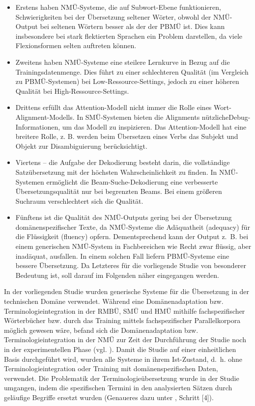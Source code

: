 \sloppy
\begin{itemize}
\item
Erstens haben NMÜ-Systeme, die auf Subwort{}-Ebene funktionieren, Schwierigkeiten bei der Übersetzung seltener Wörter, obwohl der NMÜ-Output bei seltenen Wörtern besser als der der PBMÜ ist. Dies kann insbesondere bei stark flektierten Sprachen ein Problem darstellen, da viele Flexionsformen selten auftreten können.
\item
Zweitens haben NMÜ-Systeme eine steilere Lernkurve in Bezug auf die Trainingsdatenmenge. Dies führt zu einer schlechteren Qualität (im Vergleich zu PBMÜ-Systemen) bei Low-Ressource-Settings, jedoch zu einer höheren Qualität bei High-Ressource-Settings.
\item
Drittens erfüllt das Attention-Modell nicht immer die Rolle eines Wort-Align\-ment-Modells. In SMÜ-Systemen bieten die Alignments nützliche\linebreak De\-bug-Informationen, um das Modell zu inspizieren. Das Attention-Modell hat eine breitere Rolle, z. B. werden beim Übersetzen eines Verbs das Subjekt und Objekt zur Disambiguierung berücksichtigt.
\item
Viertens -- die Aufgabe der Dekodierung besteht darin, die vollständige Satzübersetzung mit der höchsten Wahrscheinlichkeit zu finden. In NMÜ-Systemen ermöglicht die Beam-Suche-Dekodierung eine verbesserte Übersetzungsqualität nur bei begrenzten Beams. Bei einem größeren Suchraum verschlechtert sich die Qualität.
\item
Fünftens ist die Qualität des NMÜ-Outputs gering bei der Übersetzung domänenspezifischer Texte, da NMÜ-Systeme die Adäquatheit (adequacy) für die Flüssigkeit (fluency) opfern. Dementsprechend kann der Output z.~B. bei einem generischen NMÜ-System in Fachbereichen wie Recht zwar flüssig, aber inadäquat, ausfallen. In einem solchen Fall liefern PBMÜ-Systeme eine bessere Übersetzung. \citep{Köhn2017} Da Letzteres für die vorliegende Studie von besonderer Bedeutung ist, soll darauf im Folgenden näher eingegangen werden.
\end{itemize}
\fussy

In der vorliegenden Studie wurden generische Systeme für die Übersetzung in der technischen Domäne verwendet. Während eine Domänenadaptation bzw. Terminologieintegration in der RMBÜ, SMÜ und HMÜ mithilfe fachspezifischer Wörterbücher bzw. durch das Training mittels fachspezifischer Parallelkorpora möglich gewesen wäre, befand sich die Domänenadaptation bzw. Terminologieintegration in der NMÜ zur Zeit der Durchführung der Studie noch in der experimentellen Phase (vgl. \citealt{Eisold2017}). Damit die Studie auf einer einheitlichen Basis durchgeführt wird, wurden alle Systeme in ihrem Ist-Zustand, d.~h. ohne Terminologieintegration oder Training mit domänenspezifischen Daten, verwendet. Die Problematik der Terminologieübersetzung wurde in der Studie umgangen, indem die spezifischen Termini in den analysierten Sätzen durch geläufige Begriffe ersetzt wurden (Genaueres dazu unter , Schritt [4]).

